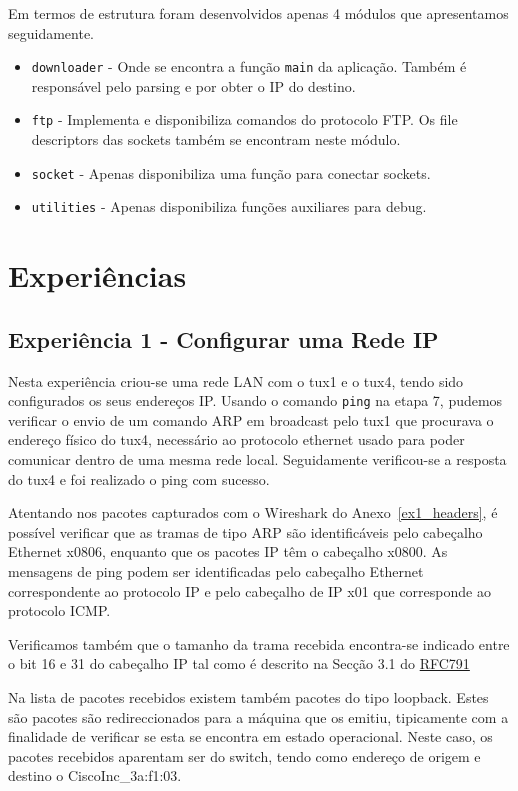 \documentclass[11pt,a4paper,reqno]{report}
\numberwithin{equation}{section}
\begin{document}
Em termos de estrutura foram desenvolvidos apenas 4 módulos que apresentamos seguidamente.
\begin{itemize} 
\item \verb|downloader| - Onde se encontra a função \verb|main| da aplicação. Também é responsável pelo parsing e por obter o IP do destino.
\item \verb|ftp| -  Implementa e disponibiliza comandos do protocolo FTP. Os file descriptors das sockets também se encontram neste módulo.
\item \verb|socket| - Apenas disponibiliza uma função para conectar sockets.
\item \verb|utilities| - Apenas disponibiliza funções auxiliares para debug.
\end{itemize}


\chapter{Experiências}


\section{Experiência 1 - Configurar uma Rede IP}

Nesta experiência criou-se uma rede LAN com o tux1 e o tux4, tendo sido configurados os seus endereços IP. Usando o comando \verb|ping| na etapa 7, pudemos verificar o envio de um comando ARP em broadcast pelo tux1 que procurava o endereço físico do tux4, necessário ao protocolo ethernet usado para poder comunicar dentro de uma mesma rede local. Seguidamente verificou-se a resposta do tux4 e foi realizado o ping com sucesso.

Atentando nos pacotes capturados com o Wireshark do Anexo~\ref{ex1_headers}, é possível verificar que as tramas de tipo ARP são identificáveis pelo cabeçalho Ethernet x0806, enquanto que os pacotes IP têm o cabeçalho x0800. As mensagens de ping podem ser identificadas pelo cabeçalho Ethernet correspondente ao protocolo IP e pelo cabeçalho de IP x01 que corresponde ao protocolo ICMP.

Verificamos também que o tamanho da trama recebida encontra-se indicado entre o bit 16 e 31 do cabeçalho IP tal como é descrito na Secção 3.1 do \href{https://www.ietf.org/rfc/rfc791.txt}{RFC791}

Na lista de pacotes recebidos existem também pacotes do tipo loopback. Estes são pacotes são redireccionados para a máquina que os emitiu, tipicamente com a finalidade de verificar se esta se encontra em estado operacional. Neste caso, os pacotes recebidos aparentam ser do switch, tendo como endereço de origem e destino o CiscoInc\_3a:f1:03.
\end{document}
